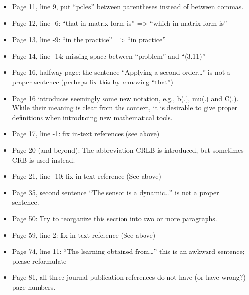 \documentclass[11pt]{article}
\begin{document}
\begin{itemize}
\begin{itemize}
    \item Page 11, line 9, put “poles” between parentheses instead of between commas.
    \item Page 12, line -6: “that in matrix form is” => “which in matrix form is”
    \item Page 13, line -9: “in the practice” => “in practice”
    \item Page 14, line -14: missing space between “problem” and “(3.11)”
    \item Page 16, halfway page: the sentence “Applying a second-order…” is not a proper sentence (perhaps fix this by removing “that”).
    \item Page 16 introduces seemingly some new notation, e.g., b(.), mu(.) and C(.). While their meaning is clear from the context, it is desirable to give proper definitions when introducing new mathematical tools.
    \item Page 17, line -1: fix in-text references (see above)
    \item Page 20 (and beyond): The abbreviation CRLB is introduced, but sometimes CRB is used instead.
    \item Page 21, line -10: fix in-text reference (See above)
    \item Page 35, second sentence “The sensor is a dynamic…” is not a proper sentence.
    \item Page 50: Try to reorganize this section into two or more paragraphs.
    \item Page 59, line 2: fix in-text reference (See above)
    \item Page 74, line 11: “The learning obtained from…” this is an awkward sentence; please reformulate
    \item Page 81, all three journal publication references do not have (or have wrong?) page numbers.
    \end{itemize}
\end{itemize}




\end{document}
